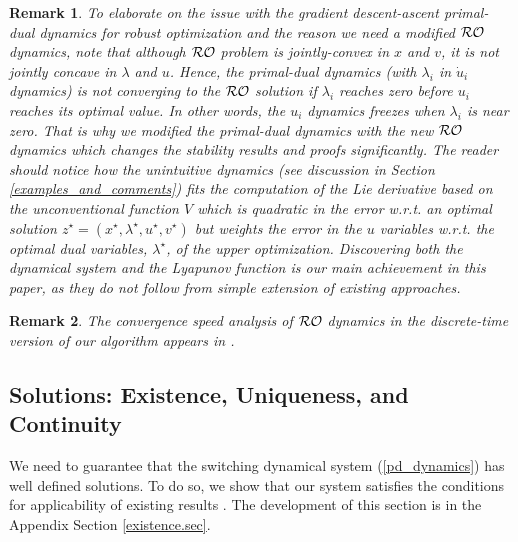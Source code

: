 \documentclass[journal,twoside,web]{ieeecolor}
\newtheorem{remark}{Remark}
\begin{document}
\begin{remark} \label{remark_reader_notice}
To elaborate on the issue with the gradient descent-ascent primal-dual dynamics for robust optimization and the reason we need a modified ${\cal RO}$ dynamics, note that although ${\cal RO}$ problem is jointly-convex in $x$ and $v$, it is not jointly concave in $\lambda$ and $u$. Hence, the primal-dual dynamics (with $\lambda_i$ in $\dot u_i$ dynamics) is not converging to the ${\cal RO}$ solution if $\lambda_i$ reaches zero before $u_i$ reaches its optimal value. In other words, the $u_i$ dynamics freezes when $\lambda_i$ is near zero. That is why we modified the primal-dual dynamics with the new ${\cal RO}$ dynamics which changes the stability results and proofs significantly.
The reader should notice how the unintuitive dynamics (see discussion in Section \ref{examples_and_comments}) fits the computation of the Lie derivative based on the unconventional function $V$ which is quadratic in the error w.r.t. an optimal solution $z^\star=(x^\star,\lambda^\star,u^\star,v^\star)$ but weights the error in the $u$ variables w.r.t. the optimal dual variables, $\lambda^\star$, of the upper optimization. Discovering both the dynamical system and the Lyapunov function is our main achievement in this paper, as they do not follow from simple extension of existing approaches.
\end{remark}

\begin{remark} \label{convergence_speed}
The convergence speed analysis of ${\cal RO}$ dynamics in the discrete-time version of our algorithm appears in \cite{ebrahimi2019cdc}.
\end{remark}

\subsection{Solutions: Existence, Uniqueness, and Continuity}
We need to guarantee that the switching dynamical system (\ref{pd_dynamics}) has well defined solutions.
To do so, we show that our system satisfies the conditions for applicability of existing results \cite{cherukuri2016}. The development of this section is in the Appendix Section \ref{existence.sec}.
\end{document}
